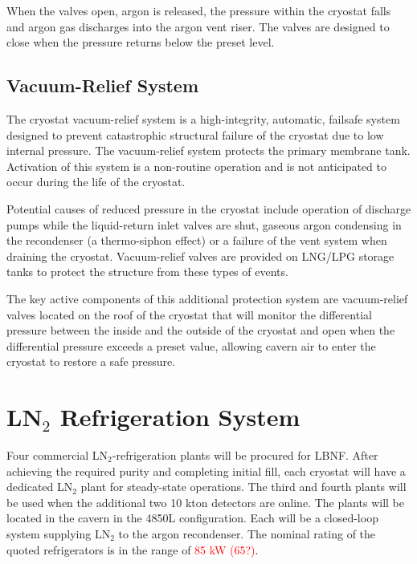 When the valves open, argon is released, the pressure within the cryostat falls and argon gas discharges into the argon vent riser.  The valves are designed to close when the pressure returns below the preset level.

\subsection{Vacuum-Relief System}

The cryostat vacuum-relief system is a high-integrity, automatic, failsafe system designed to prevent catastrophic structural failure of the cryostat due to low internal pressure.  The vacuum-relief system protects the primary membrane tank. Activation of this system is a non-routine operation and is not anticipated to occur during the life of the cryostat. 

Potential causes of reduced pressure in the cryostat include operation of discharge pumps while the liquid-return inlet valves are shut, gaseous argon condensing in the recondenser (a thermo-siphon effect) or a failure of the vent system when draining the cryostat.  Vacuum-relief valves are provided on LNG/LPG storage tanks to protect the structure from these types of events.  


The key active components of this additional protection system are vacuum-relief valves located on the roof of the cryostat that will monitor the differential pressure between the inside and the outside of the cryostat and open when the differential pressure exceeds a preset value, allowing cavern air to enter the cryostat to restore a safe pressure. 

\section{LN$_2$ Refrigeration System}
\label{sec:ln-refrig-sys}
Four commercial LN$_2$-refrigeration plants will be procured for LBNF.  
After achieving the required purity and completing initial fill, each 
cryostat will have a dedicated LN$_2$ plant for steady-state operations.
The third and fourth plants will be used when the additional two 10 kton 
detectors are online. The plants will be located in the cavern in the 
4850L configuration. Each will be a closed-loop system supplying LN$_2$
to the argon recondenser. The nominal rating of the quoted
refrigerators is in the range of \textcolor{red}{85 kW (65?)}.

